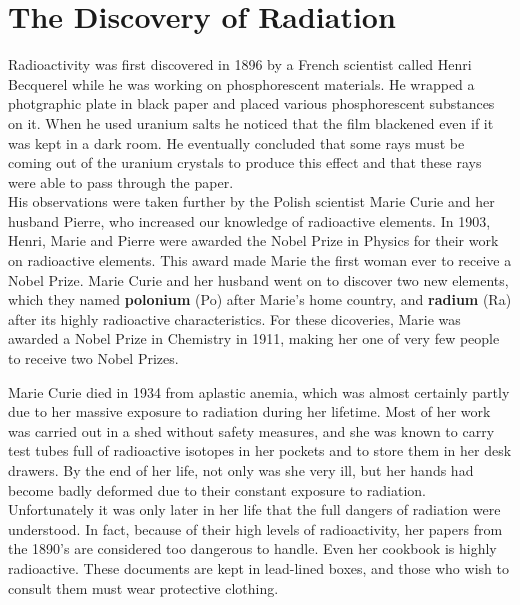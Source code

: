 



\section{The Discovery of Radiation}
\label{sec:an:td}

Radioactivity was first discovered in 1896 by a French scientist called Henri Becquerel while he was working on phosphorescent materials. He wrapped a photgraphic plate in black paper and placed various phosphorescent substances on it. When he used uranium salts he noticed that the film blackened even if it was kept in a dark room. He eventually concluded that some rays must be coming out of the uranium crystals to produce this effect and that these rays were able to pass through the paper. \\

His observations were taken further by the Polish scientist Marie Curie and her husband Pierre, who increased our knowledge of radioactive elements. In 1903, Henri, Marie and Pierre were awarded the Nobel Prize in Physics for their work on radioactive elements. This award made Marie the first woman ever to receive a Nobel Prize. Marie Curie and her husband went on to discover two new elements, which they named \textbf{polonium} (Po) after Marie's home country, and \textbf{radium} (Ra) after its highly radioactive characteristics. For these dicoveries, Marie was awarded a Nobel Prize in Chemistry in 1911, making her one of very few people to receive two Nobel Prizes. \\

\begin{IFact}
{Marie Curie died in 1934 from aplastic anemia, which was almost certainly partly due to her massive exposure to radiation during her lifetime. Most of her work was carried out in a shed without safety measures, and she was known to carry test tubes full of radioactive isotopes in her pockets and to store them in her desk drawers. By the end of her life, not only was she very ill, but her hands had become badly deformed due to their constant exposure to radiation. Unfortunately it was only later in her life that the full dangers of radiation were understood. In fact, because of their high levels of radioactivity, her papers from the 1890's are considered too dangerous to handle. Even her cookbook is highly radioactive. These documents are kept in lead-lined boxes, and those who wish to consult them must wear protective clothing. }
\end{IFact}


